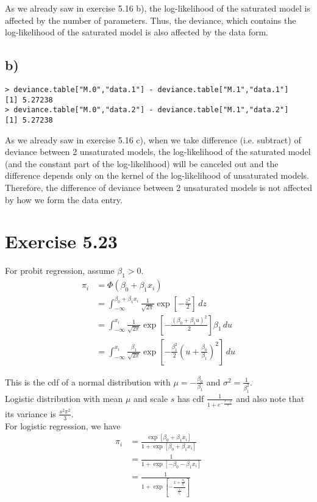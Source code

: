 \documentclass[a4paper]{article}
\begin{document}
As we already saw in exercise 5.16 b), the log-likelihood of the saturated model is affected by the number of parameters. Thus, the deviance, which contains the log-likelihood of the saturated model is also affected by the data form.


\vspace{\baselineskip}
\subsection{b)}
\begin{lstlisting}
> deviance.table["M.0","data.1"] - deviance.table["M.1","data.1"]
[1] 5.27238
> deviance.table["M.0","data.2"] - deviance.table["M.1","data.2"]
[1] 5.27238
\end{lstlisting}

As we already saw in exercise 5.16 c), when we take difference (i.e. subtract) of deviance between 2 unsaturated models, the log-likelihood of the saturated model (and the constant part of the log-likelihood) will be canceled out and the difference depends only on the kernel of the log-likelihood of unsaturated models. Therefore, the difference of deviance between 2 unsaturated models is not affected by how we form the data entry.


\vspace{\baselineskip}
\section{Exercise 5.23}
For probit regression, assume $\beta_{1} > 0$.
\begin{align*}
\pi_{i} &= \Phi(\beta_{0} + \beta_{1}x_{i})\\
&= \int_{-\infty}^{\beta_{0} + \beta_{1}x_{i}} \frac{1}{\sqrt{2\pi}}\exp\left[-\frac{z^{2}}{2} \right] \, dz\\
&= \int_{-\infty}^{x_{i}} \frac{1}{\sqrt{2\pi}}\exp\left[-\frac{(\beta_{0} + \beta_{1}u)^{2}}{2} \right] \beta_{1} \, du\\
&= \int_{-\infty}^{x_{i}} \frac{\beta_{1}}{\sqrt{2\pi}}\exp\left[-\frac{\beta_{1}^2}{2}\left(u+\frac{\beta_{0}}{\beta_{1}}\right)^{2} \right] \, du
\end{align*}

This is the cdf of a normal distribution with $\mu = -\frac{\beta_{0}}{\beta_{1}}$ and $\sigma^{2} = \frac{1}{\beta_{1}^{2}}$.\\

Logistic distribution with mean $\mu$ and scale $s$ has cdf $\frac{1}{1+e^{-{\frac{x-\mu}{s}}}}$ and also note that its variance is $\frac{s^{2}\pi^{2}}{3}$.\\
For logistic regression, we have
\begin{align*}
\pi_{i} &= \frac{\exp\left[\beta_{0} + \beta_{1}x_{i}\right]}{1+\exp\left[\beta_{0} + \beta_{1}x_{i}\right]}\\
&= \frac{1}{1+\exp\left[-\beta_{0} -\beta_{1}x_{i}\right]}\\
&= \frac{1}{1+\exp\left[-\frac{x+\frac{\beta_{0}}{\beta_{1}}}{\frac{1}{\beta_{1}}}\right]}
\end{align*}
\end{document}
